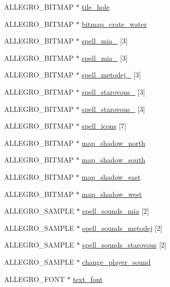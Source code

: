 \begin{DoxyCompactItemize}
\item 
A\-L\-L\-E\-G\-R\-O\-\_\-\-B\-I\-T\-M\-A\-P $\ast$ \hyperlink{classc__map_a539c61c09b1a762ef657139f22ebd7c1}{tile\-\_\-hole}
\item 
A\-L\-L\-E\-G\-R\-O\-\_\-\-B\-I\-T\-M\-A\-P $\ast$ \hyperlink{classc__map_a9b6b2ac643bd82db8acf37753e86482b}{bitmap\-\_\-crate\-\_\-water}
\item 
A\-L\-L\-E\-G\-R\-O\-\_\-\-B\-I\-T\-M\-A\-P $\ast$ \hyperlink{classc__map_a6191d8333fa50a672d1cb02957182b7e}{spell\-\_\-mia\-\_} \mbox{[}3\mbox{]}
\item 
A\-L\-L\-E\-G\-R\-O\-\_\-\-B\-I\-T\-M\-A\-P $\ast$ \hyperlink{classc__map_abea93f3e180070e80bb0dc7f061969cb}{spell\-\_\-mia\-\_} \mbox{[}3\mbox{]}
\item 
A\-L\-L\-E\-G\-R\-O\-\_\-\-B\-I\-T\-M\-A\-P $\ast$ \hyperlink{classc__map_a7299ee552482b6917b4aae7f24263392}{spell\-\_\-metodej\-\_} \mbox{[}3\mbox{]}
\item 
A\-L\-L\-E\-G\-R\-O\-\_\-\-B\-I\-T\-M\-A\-P $\ast$ \hyperlink{classc__map_aaa728703ee5b40637e354f26dcb4f136}{spell\-\_\-starovous\-\_} \mbox{[}3\mbox{]}
\item 
A\-L\-L\-E\-G\-R\-O\-\_\-\-B\-I\-T\-M\-A\-P $\ast$ \hyperlink{classc__map_af8e66f5af3e07acfbcf780e21669b1e0}{spell\-\_\-starovous\-\_} \mbox{[}3\mbox{]}
\item 
A\-L\-L\-E\-G\-R\-O\-\_\-\-B\-I\-T\-M\-A\-P $\ast$ \hyperlink{classc__map_afe0fe7415fc6ab78e753dbb95901dee7}{spell\-\_\-icons} \mbox{[}7\mbox{]}
\item 
A\-L\-L\-E\-G\-R\-O\-\_\-\-B\-I\-T\-M\-A\-P $\ast$ \hyperlink{classc__map_a5bf782d167ce72e2a115c4817954b3db}{map\-\_\-shadow\-\_\-north}
\item 
A\-L\-L\-E\-G\-R\-O\-\_\-\-B\-I\-T\-M\-A\-P $\ast$ \hyperlink{classc__map_a0309d1046d20db4eb0bb065d0d4a6201}{map\-\_\-shadow\-\_\-south}
\item 
A\-L\-L\-E\-G\-R\-O\-\_\-\-B\-I\-T\-M\-A\-P $\ast$ \hyperlink{classc__map_aa388806f4a767a2b6732b0ea3cf12e0d}{map\-\_\-shadow\-\_\-east}
\item 
A\-L\-L\-E\-G\-R\-O\-\_\-\-B\-I\-T\-M\-A\-P $\ast$ \hyperlink{classc__map_ad49b7ca28467f986d4b8a2e69ed1e15e}{map\-\_\-shadow\-\_\-west}
\item 
A\-L\-L\-E\-G\-R\-O\-\_\-\-S\-A\-M\-P\-L\-E $\ast$ \hyperlink{classc__map_abb19c6e3c47f8d1182fe746f1e6ccc40}{spell\-\_\-sounds\-\_\-mia} \mbox{[}2\mbox{]}
\item 
A\-L\-L\-E\-G\-R\-O\-\_\-\-S\-A\-M\-P\-L\-E $\ast$ \hyperlink{classc__map_aec438098bd5ded52ab9c831cd19eb629}{spell\-\_\-sounds\-\_\-metodej} \mbox{[}2\mbox{]}
\item 
A\-L\-L\-E\-G\-R\-O\-\_\-\-S\-A\-M\-P\-L\-E $\ast$ \hyperlink{classc__map_ae7b220711fb2815dc1ac925b39fa81ca}{spell\-\_\-sounds\-\_\-starovous} \mbox{[}2\mbox{]}
\item 
A\-L\-L\-E\-G\-R\-O\-\_\-\-S\-A\-M\-P\-L\-E $\ast$ \hyperlink{classc__map_a046d71e73934bf557644cd207facccdf}{change\-\_\-player\-\_\-sound}
\item 
A\-L\-L\-E\-G\-R\-O\-\_\-\-F\-O\-N\-T $\ast$ \hyperlink{classc__map_ada9b97f91338614f93a9a95fdfd7157b}{text\-\_\-font}
\end{DoxyCompactItemize}


